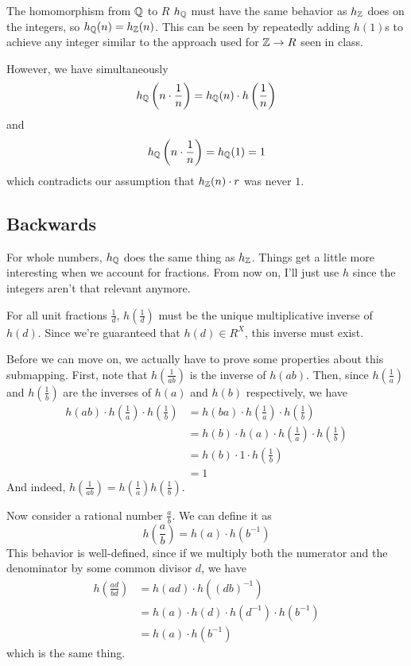 \documentclass[12pt]{article}
\begin{document}
The homomorphism from $\mathbb{Q}$ to $R$ $h_{\mathbb{Q}}$ must have the same behavior as $h_{\mathbb{Z}}$
does on the integers, so $h_{\mathbb{Q}}(n)=h_{\mathbb{Z}}(n)$.
This can be seen by repeatedly adding $h(1)$s to achieve any integer
similar to the approach used for $\mathbb{Z} \to R$ seen in class.

However, we have simultaneously
\[h_{\mathbb{Q}}\left(n \cdot \frac{1}{n}\right) = h_{\mathbb{Q}}(n) \cdot h\left(\frac{1}{n}\right)\]
and
\[h_{\mathbb{Q}}\left(n \cdot \frac{1}{n}\right) = h_{\mathbb{Q}}(1) = 1\]
which contradicts our assumption that $h_{\mathbb{Z}}(n) \cdot r$ was never $1$.

\subsection{Backwards}

For whole numbers, $h_{\mathbb{Q}}$ does the same thing as $h_{\mathbb{Z}}$.
Things get a little more interesting when we account for fractions.
From now on, I'll just use $h$ since the integers aren't that relevant anymore.

For all unit fractions $\frac{1}{d}$, $h\left(\frac{1}{d}\right)$
must be the unique multiplicative inverse of $h(d)$.
Since we're guaranteed that $h(d) \in R^X$, this inverse must exist.

Before we can move on, we actually have to prove some properties about this submapping.
First, note that $h\left(\frac{1}{ab}\right)$ is the inverse of $h(ab)$.
Then, since $h\left(\frac{1}{a}\right)$ and $h\left(\frac{1}{b}\right)$
are the inverses of $h(a)$ and $h(b)$ respectively, we have
\begin{align*}
  h(ab) \cdot h\left(\frac{1}{a}\right) \cdot h\left(\frac{1}{b}\right)
   & = h(ba) \cdot h\left(\frac{1}{a}\right) \cdot h\left(\frac{1}{b}\right)           \\
   & = h(b) \cdot h(a) \cdot h\left(\frac{1}{a}\right) \cdot h\left(\frac{1}{b}\right) \\
   & = h(b) \cdot 1 \cdot h\left(\frac{1}{b}\right)                                    \\
   & = 1
\end{align*}
And indeed, $h\left(\frac{1}{ab}\right)=h\left(\frac{1}{a}\right)h\left(\frac{1}{b}\right)$.

Now consider a rational number $\frac{a}{b}$.
We can define it as
\[h\left(\frac{a}{b}\right) = h(a) \cdot h\left(b^{-1}\right)\]
This behavior is well-defined, since if we multiply both the numerator
and the denominator by some common divisor $d$, we have
\begin{align*}
  h\left(\frac{ad}{bd}\right)
   & = h(ad) \cdot h\left((db)^{-1}\right)                                   \\
   & = h(a) \cdot h(d) \cdot h\left(d^{-1}\right) \cdot h\left(b^{-1}\right) \\
   & = h(a) \cdot h\left(b^{-1}\right)
\end{align*}
which is the same thing.
\end{document}
